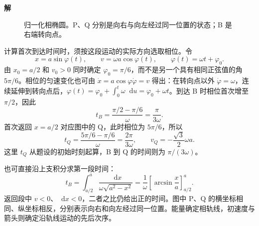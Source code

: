 \documentclass[11pt,openany,fontset=fandol]{ctexbook}
\theoremstyle{definition}\newtheorem{example}{例}[chapter]\newtheorem{exercise}{习题}[chapter]
\newcommand{\SolutionStart}{\par\medskip\ifdim\pagetotal>0pt\ifdim\dimexpr\pagegoal-\pagetotal\relax<3\baselineskip\newpage\fi\fi\noindent\textbf{解}\quad\ignorespaces}
\newenvironment{solution}{\SolutionStart}{\par\medskip}
\newcommand{\dd}{\mathop{}\!\mathrm d}\newcommand{\ee}{\mathrm e}\newcommand{\vct}[1]{\bm{#1}}
\begin{document}
\begin{solution}
\begin{figure}[H]
\caption{归一化相椭圆。P、Q 分别是向右与向左经过同一位置的状态；B 是右端转向点。}\label{mp4:fig:l4-e1-s}
\end{figure}

计算首次到达时间时，须按这段运动的实际方向选取相位。令
\[
x=a\sin\varphi(t),\qquad v=\omega a\cos\varphi(t),
\qquad \varphi(t)=\omega t+\varphi_0.
\]
由 $x_0=a/2$ 和 $v_0>0$ 同时确定 $\varphi_0=\pi/6$，而不是另一个具有相同正弦值的角 $5\pi/6$。相位的匀速变化也可由 $\dot x=a\cos\varphi\dot\varphi=v$ 得出：在转向点以外 $\dot\varphi=\omega$，连续延伸到转向点后，$\varphi(t)=\varphi_0+\int_0^t\omega\dd u=\varphi_0+\omega t$。到达 B 时相位首次增至 $\pi/2$，因此
\[
t_B=\frac{\pi/2-\pi/6}{\omega}=\frac{\pi}{3\omega}.
\]
首次返回 $x=a/2$ 对应图中的 Q，此时相位为 $5\pi/6$，所以
\[
t_Q=\frac{5\pi/6-\pi/6}{\omega}=\frac{2\pi}{3\omega},
\qquad v_Q=-\frac{\sqrt3}{2}\omega a.
\]
这里 $t_Q$ 从题设的初始时刻起算，B 到 Q 的时间则为 $\pi/(3\omega)$。

也可直接沿上支积分求第一段时间：
\[
t_B=\int_{a/2}^{a}\frac{\dd x}{\omega\sqrt{a^2-x^2}}
=\frac1\omega\left[\arcsin\frac xa\right]_{a/2}^{a}.
\]
返回段中 $v<0$、$\dd x<0$，二者之比仍给出正的时间。图中 P、Q 的横坐标相同、纵坐标相反，分别表示向右和向左经过同一位置。能量确定相轨线，初速度与箭头则确定沿轨线运动的先后次序。
\end{solution}
\end{document}
